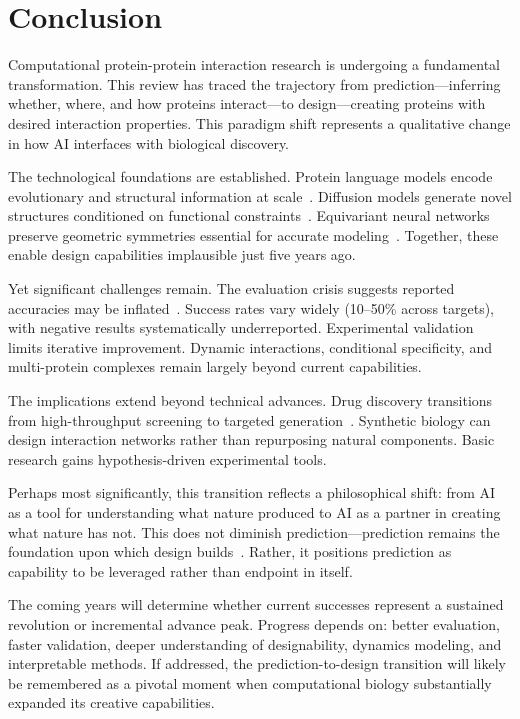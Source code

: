 \section{Conclusion}
\label{sec:conclusion}

Computational protein-protein interaction research is undergoing a fundamental transformation. This review has traced the trajectory from prediction---inferring whether, where, and how proteins interact---to design---creating proteins with desired interaction properties. This paradigm shift represents a qualitative change in how AI interfaces with biological discovery.

The technological foundations are established. Protein language models encode evolutionary and structural information at scale~\cite{rives2021esm1b,lin2023esm2}. Diffusion models generate novel structures conditioned on functional constraints~\cite{watson2023rfdiffusion,ingraham2023chroma}. Equivariant neural networks preserve geometric symmetries essential for accurate modeling~\cite{jing2021gvp,fuchs2020se3transformer}. Together, these enable design capabilities implausible just five years ago.

Yet significant challenges remain. The evaluation crisis suggests reported accuracies may be inflated~\cite{bernett2024bias}. Success rates vary widely (10--50\% across targets), with negative results systematically underreported. Experimental validation limits iterative improvement. Dynamic interactions, conditional specificity, and multi-protein complexes remain largely beyond current capabilities.

The implications extend beyond technical advances. Drug discovery transitions from high-throughput screening to targeted generation~\cite{zambaldi2024alphaproteo}. Synthetic biology can design interaction networks rather than repurposing natural components. Basic research gains hypothesis-driven experimental tools.

Perhaps most significantly, this transition reflects a philosophical shift: from AI as a tool for understanding what nature produced to AI as a partner in creating what nature has not. This does not diminish prediction---prediction remains the foundation upon which design builds~\cite{jumper2021alphafold,dauparas2022proteinmpnn}. Rather, it positions prediction as capability to be leveraged rather than endpoint in itself.

The coming years will determine whether current successes represent a sustained revolution or incremental advance peak. Progress depends on: better evaluation, faster validation, deeper understanding of designability, dynamics modeling, and interpretable methods. If addressed, the prediction-to-design transition will likely be remembered as a pivotal moment when computational biology substantially expanded its creative capabilities.

